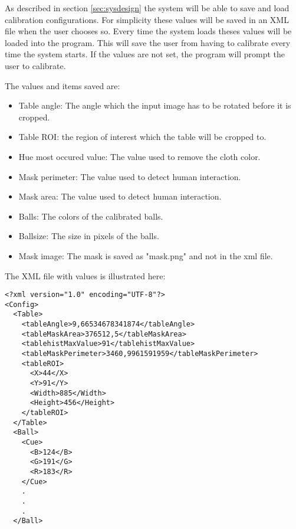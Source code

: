 As described in section \ref{sec:sysdesign} the system will be able to save and load calibration configurations. For simplicity these values will be saved in an XML file when the user chooses so. Every time the system loads theses values will be loaded into the program. This will save the user from having to calibrate every time the system starts. If the values are not set, the program will prompt the user to calibrate.

The values and items saved are:
\begin{itemize}
	\item Table angle: The angle which the input image has to be rotated before it is cropped.
	\item Table ROI: the region of interest which the table will be cropped to.
	\item Hue most occured value: The value used to remove the cloth color.
	\item Mask perimeter: The value used to detect human interaction.
	\item Mask area: The value used to detect human interaction.
	\item Balls: The colors of the calibrated balls.
	\item Ballsize: The size in pixels of the balls.
	\item Mask image: The mask is saved as "mask.png" and not in the xml file.
\end{itemize}

The XML file with values is illustrated here:

\lstset{language=XML}
\begin{lstlisting}
<?xml version="1.0" encoding="UTF-8"?>
<Config>
  <Table>
    <tableAngle>9,66534678341874</tableAngle>
    <tableMaskArea>376512,5</tableMaskArea>
    <tablehistMaxValue>91</tablehistMaxValue>
    <tableMaskPerimeter>3460,9961591959</tableMaskPerimeter>
    <tableROI>
      <X>44</X>
      <Y>91</Y>
      <Width>885</Width>
      <Height>456</Height>
    </tableROI>
  </Table>
  <Ball>
    <Cue>
      <B>124</B>
      <G>191</G>
      <R>183</R>
    </Cue>
    .
    .
    .
  </Ball>
\end{lstlisting}

